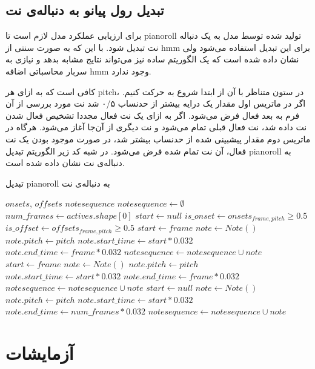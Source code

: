 \subsection{تبدیل رول پیانو به دنباله‌ی نت}
برای ارزیابی عملکرد مدل لازم است تا \gls{pianoroll} تولید شده توسط مدل به یک
دنباله نت تبدیل شود. با این که به صورت سنتی از \gls{hmm} برای این تبدیل استفاده
می‌شود ولی نشان داده شده است که یک الگوریتم ساده نیز می‌تواند نتایج مشابه بدهد و
نیازی به سربار محاسباتی اضافه \gls{hmm} وجود ندارد.

کافی است که به ازای هر \gls{pitch}، در ستون متناظر با آن از ابتدا شروع به حرکت
کنیم. اگر در ماتریس اول مقدار یک درایه بیشتر از حدنساب ۰/۵ شد نت مورد بررسی از
آن فرم به بعد فعال فرض می‌شود. اگر به ازای یک نت فعال مجددا تشخیص فعال شدن نت
داده شد، نت فعال قبلی تمام می‌شود و نت دیگری از آن‌جا آغاز می‌شود. هرگاه در
ماتریس دوم مقدار پیشبینی شده از حدنساب بیشتر شد، در صورت موجود بودن یک نت فعال،
آن نت تمام شده فرض می‌شود. در شبه کد زیر الگوریتم تبدیل \gls{pianoroll} به
دنباله‌ی نت نشان داده شده است.
\begin{algorithm}[ht]
\caption{تبدیل \gls{pianoroll} به دنباله‌ی نت}
\begin{algorithmic}
\begin{latin}
    \Require $onsets$, $offsets$
    \Ensure $notesequence$
    \State $notesequence \leftarrow \emptyset$
    \State $num\_frames \leftarrow actives.shape[0]$
        \State $start \leftarrow null$
            \State $is\_onset \leftarrow onsets_{frame, pitch} \geq 0.5$
            \State $is\_offset \leftarrow offsets_{frame, pitch} \geq 0.5$
                \State $start \leftarrow frame$
                \State $note \leftarrow Note()$
                \State $note.pitch \leftarrow pitch$
                \State $note.start\_time \leftarrow start * 0.032$
                \State $note.end\_time \leftarrow frame * 0.032$
                \State $notesequence \leftarrow notesequence \cup note$
                \State $start \leftarrow frame$
                \State $note \leftarrow Note()$
                \State $note.pitch \leftarrow pitch$
                \State $note.start\_time \leftarrow start * 0.032$
                \State $note.end\_time \leftarrow frame * 0.032$
                \State $notesequence \leftarrow notesequence \cup note$
                \State $start \leftarrow null$
            \EndIf
        \EndFor
            \State $note \leftarrow Note()$
            \State $note.pitch \leftarrow pitch$
            \State $note.start\_time \leftarrow start * 0.032$
            \State $note.end\_time \leftarrow num\_frames * 0.032$
            \State $notesequence \leftarrow notesequence \cup note$
        \EndIf
    \EndFor
\end{latin}
\end{algorithmic}
\end{algorithm}

\section{آزمایشات}